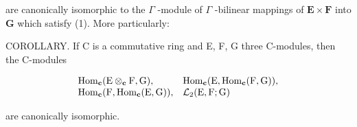 are canonically isomorphic to the \(\Gamma\) -module of \(\Gamma\) -bilinear mappings of \(\mathbf{E} \times \mathbf{F}\) into \(\mathbf{G}\) which satisfy (1). More particularly:

COROLLARY. If C is a commutative ring and E, F, G three C-modules, then the C-modules

\[
\begin{array}{l l} \operatorname{Hom} _ {\mathbf {c}} (\mathrm{E} \otimes_ {\mathbf {c}} \mathrm{F}, \mathrm{G}), & \operatorname{Hom} _ {\mathbf {c}} (\mathrm{E}, \operatorname{Hom} _ {\mathbf {c}} (\mathrm{F}, \mathrm{G})), \\ \operatorname{Hom} _ {\mathbf {c}} (\mathrm{F}, \operatorname{Hom} _ {\mathbf {c}} (\mathrm{E}, \mathrm{G})), & \mathcal {L} _ {2} (\mathrm{E}, \mathrm{F}; \mathrm{G}) \end{array}
\]

are canonically isomorphic.
\relax{}
